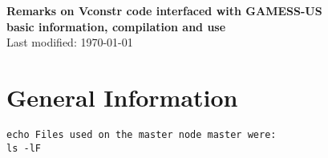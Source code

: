 \documentclass[10pt]{article}
\begin{document}
\thispagestyle{first}
\footnotesize

\begin{center}
    \Large{\textbf{Remarks on Vconstr code interfaced with GAMESS-US}} \\ 
    \normalsize{\textbf{basic information, compilation and use}} \\
    \normalsize{Last modified: \today}
\end{center}

\section{General Information}
\begin{verbatim}
echo Files used on the master node master were:
ls -lF 
\end{verbatim}
\end{document}
